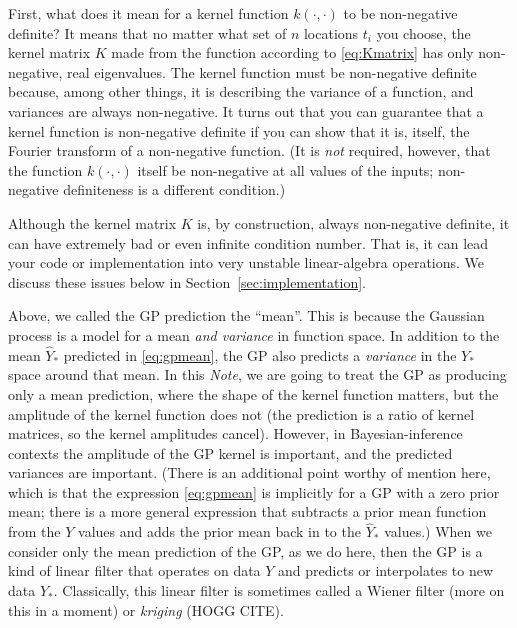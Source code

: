 \documentclass[12pt,letterpaper]{article}
\newcommand{\documentname}{\textsl{Note}}
\newcommand{\sectionname}{Section}
\begin{document}
First, what does it mean for a kernel function $k(\cdot,\cdot)$ to be non-negative definite?
It means that no matter what set of $n$ locations $t_i$ you choose, the kernel matrix $K$ made from the function according to \eqref{eq:Kmatrix} has only non-negative, real eigenvalues.
The kernel function must be non-negative definite because, among other things, it is describing the variance of a function, and variances are always non-negative.
It turns out that you can guarantee that a kernel function is non-negative definite if you can show that it is, itself, the Fourier transform of a non-negative function.
(It is \emph{not} required, however, that the function $k(\cdot,\cdot)$ itself be non-negative at all values of the inputs; non-negative definiteness is a different condition.)

Although the kernel matrix $K$ is, by construction, always non-negative definite, it can have extremely bad or even infinite condition number. That is, it can lead your code or implementation into very unstable linear-algebra operations. We discuss these issues below in \sectionname~\ref{sec:implementation}.

Above, we called the GP prediction the ``mean''. This is because the Gaussian process is a model for a mean \emph{and variance} in function space.
In addition to the mean $\hat{Y}_\ast$ predicted in \eqref{eq:gpmean}, the GP also predicts a \emph{variance} in the $Y_\ast$ space around that mean.
In this \documentname, we are going to treat the GP as producing only a mean prediction, where the shape of the kernel function matters, but the amplitude of the kernel function does not (the prediction is a ratio of kernel matrices, so the kernel amplitudes cancel).
However, in Bayesian-inference contexts the amplitude of the GP kernel is important, and the predicted variances are important.
(There is an additional point worthy of mention here, which is that the expression \eqref{eq:gpmean} is implicitly for a GP with a zero prior mean; there is a more general expression that subtracts a prior mean function from the $Y$ values and adds the prior mean back in to the $\hat{Y}_\ast$ values.)
When we consider only the mean prediction of the GP, as we do here, then the GP is a kind of linear filter that operates on data $Y$ and predicts or interpolates to new data $Y_\ast$.
Classically, this linear filter is sometimes called a Wiener filter (more on this in a moment) or \emph{kriging} (HOGG CITE).
\end{document}
